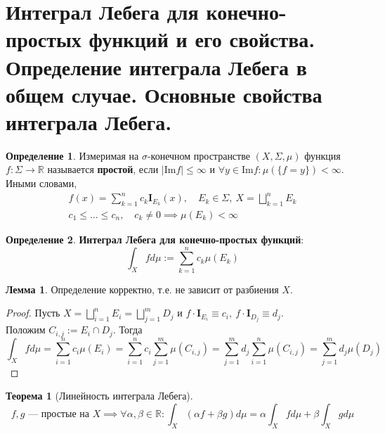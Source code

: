 \documentclass[11pt,a4paper]{report}
\def\Real{\mathbb{R}}
\theoremstyle{definition}
\theoremstyle{definition}
\newtheorem{theorem}{Теорема}[section]
\newtheorem{lemma}{Лемма}[section]
\theoremstyle{definition}
\newtheorem{definition}{Определение}[section]
\begin{document}
	\section{Интеграл Лебега для конечно-простых функций и его свойства. Определение интеграла Лебега в общем случае. Основные свойства интеграла Лебега.}
		\begin{definition}
			Измеримая на $ \sigma $-конечном пространстве $ (X, \Sigma, \mu) $ функция $ f: \Sigma \to \Real $ называется \textbf{простой}, если $ |\mbox{Im} f| \le \infty $ и $ \forall y \in \mbox{Im} f: \mu(\{f = y\}) < \infty $. Иными словами, 
			\begin{gather*}
				f(x) = \sum_{k=1}^{n} c_{k} \mathbf{I}_{E_{k}}(x),\quad E_{k} \in \Sigma,\ X = \bigsqcup\limits_{k=1}^{n} E_{k}\\
				c_{1} \le \dots \le c_{n},\quad c_{k} \neq 0 \implies \mu(E_{k}) < \infty
			\end{gather*}
		\end{definition}
		\begin{definition}
			\textbf{Интеграл Лебега для конечно-простых функций}:
			\[ \int_{X} f d\mu := \sum_{k=1}^{n} c_{k} \mu(E_{k})  \]
		\end{definition}
		\begin{lemma}
			Определение корректно, т.е. не зависит от разбиения $ X $.
		\end{lemma}
		\begin{proof}
			Пусть $ X = \bigsqcup\limits_{i=1}^{n} E_{i} = \bigsqcup\limits_{j=1}^{m} D_{j} $ и $ f \cdot \mathbf{I}_{E_{i}} \equiv c_{i},\ f \cdot \mathbf{I}_{D_{j}} \equiv d_{j} $.\\ 
			Положим $ C_{i, j} := E_{i} \cap D_{j} $. Тогда 
			\[ \int_{X} f d\mu = \sum\limits_{i=1}^{n} c_{i} \mu(E_{i})  = \sum\limits_{i=1}^{n} c_{i} \sum\limits_{j=1}^{m} \mu(C_{i, j}) = \sum\limits_{j=1}^{m} d_{j} \sum\limits_{i=1}^{n} \mu(C_{i, j}) = \sum\limits_{j=1}^{m} d_{j} \mu(D_{j}) \]
		\end{proof}
		\begin{theorem}[Линейность интеграла Лебега]$  $\\
			\[ f, g \text{ — простые на } X \implies \forall \alpha, \beta \in \Real: \int_{X} (\alpha f + \beta g) d\mu = \alpha \int_{X} f d\mu + \beta \int_{X} g d\mu \] 
		\end{theorem}
\end{document}
